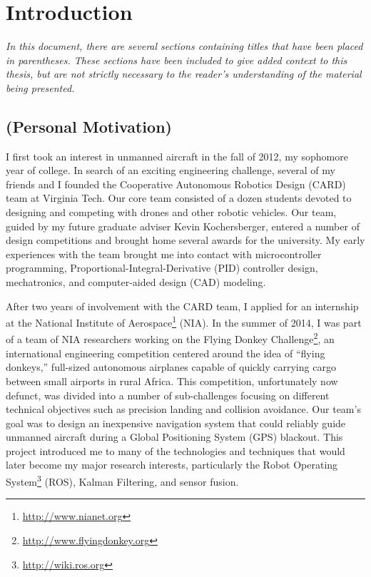\chapter{Introduction}

\textit{In this document, there are several sections containing titles that have been placed in parentheses. These sections have been included to give added context to this thesis, but are not strictly necessary to the reader's understanding of the material being presented.}

\section{(Personal Motivation)}

I first took an interest in unmanned aircraft in the fall of 2012, my sophomore year of college. In search of an exciting engineering challenge, several of my friends and I founded the Cooperative Autonomous Robotics Design (CARD) team at Virginia Tech. Our core team consisted of a dozen students devoted to designing and competing with drones and other robotic vehicles. Our team, guided by my future graduate adviser Kevin Kochersberger, entered a number of design competitions and brought home several awards for the university. My early experiences with the team brought me into contact with microcontroller programming, Proportional-Integral-Derivative (PID) controller design, mechatronics, and computer-aided design (CAD) modeling.

After two years of involvement with the CARD team, I applied for an internship at the National Institute of Aerospace\footnote{\url{http://www.nianet.org}} (NIA). In the summer of 2014, I was part of a team of NIA researchers working on the Flying Donkey Challenge\footnote{\url{http://www.flyingdonkey.org}}, an international engineering competition centered around the idea of ``flying donkeys,'' full-sized autonomous airplanes capable of quickly carrying cargo between small airports in rural Africa. This competition, unfortunately now defunct, was divided into a number of sub-challenges focusing on different technical objectives such as precision landing and collision avoidance. Our team's goal was to design an inexpensive navigation system that could reliably guide unmanned aircraft during a Global Positioning System (GPS) blackout. This project introduced me to many of the technologies and techniques that would later become my major research interests, particularly the Robot Operating System\footnote{\url{http://wiki.ros.org}} (ROS), Kalman Filtering, and sensor fusion.

